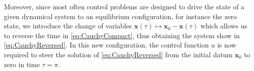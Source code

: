 Moreover, since most often control problems are designed to drive the state of a given dynamical system to an equilibrium configuration, for instance the zero state, we introduce the change of variables $\bm{x}(\tau)\mapsto \bm{x}_0 - \bm{x}(\tau)$ which allows us to reverse the time in \eqref{eq:CauchyCompact}, thus obtaining the system show in \eqref{eq:CauchyReversed}. In this new configuration, the control function $u$ is now required to steer the solution of \eqref{eq:CauchyReversed} from the initial datum $\bm{x}_0$ to zero in time $\tau=\pi$. 